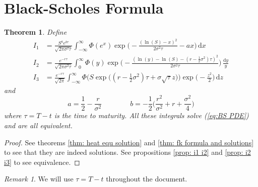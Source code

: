 \documentclass[12pt]{article}
\newtheorem{theorem}{Theorem}
\theoremstyle{definition}
\theoremstyle{remark}
\newtheorem{remark}[lemma]{Remark}
\begin{document}
\section{Black-Scholes Formula}
\begin{theorem}
	Define
	\begin{align*}
		I_1 &= \frac{S^a e^{b\tau}}{\sqrt{2\pi \sigma^2 \tau}} \int_{-\infty}^{\infty} \Phi(e^x) \exp \Big( -\frac{(\ln (S) - x)^2}{2\sigma^2 \tau} - ax \Big) \,\mathrm{d}x \\
		I_2 &= \frac{e^{-r\tau}}{\sqrt{2\pi\sigma^2\tau}} \int_0^\infty \Phi(y) \exp \Big( -\frac{\left(\ln (y) - \ln (S) - (r-\tfrac12\sigma^2)\tau\right)^2} {2\sigma^2 \tau} \Big) \, \frac{\mathrm{d}y}{y} \\
		I_3 &= \frac{e^{-r\tau}}{\sqrt{2\pi}} \int_{-\infty}^{\infty} \Phi \Big( S \exp \big((r-\frac12\sigma^2)\tau + \sigma\sqrt{\tau} z\big) \Big) \exp \Big( -\frac{z^2}{2} \Big) \,\mathrm{d} z
	\end{align*}
	and
	$$
	a = \frac{1}{2} - \frac{r}{\sigma^2}
	\qquad\qquad
	b = -\frac{1}{2} \Big( \frac{r^2}{\sigma^2} + r + \frac{\sigma^2}{4} \Big)
	$$
	where $\tau = T-t$ is the time to maturity. All these integrals solve (\ref{eq:BS PDE}) and are all equivalent.
\end{theorem}
\begin{proof}
	See theorems \ref{thm: heat equ solution} and \ref{thm: fk formula and solutions} to see that they are indeed solutions. See propositions \ref{prop: i1 i2} and \ref{prop: i2 i3} to see equivalence.
\end{proof}
\begin{remark}
	We will use $\tau = T-t$ throughout the document.
\end{remark}
\end{document}
